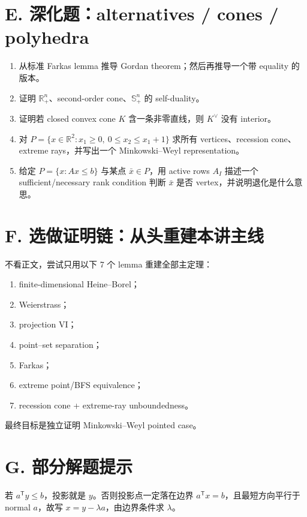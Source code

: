 \documentclass[11pt,a4paper,openany]{ctexrep}
\theoremstyle{definition}
\newcommand{\R}{\mathbb{R}}
\newcommand{\transpose}{\mathsf{T}}
\begin{document}
\section*{E. 深化题：alternatives / cones / polyhedra}
\begin{enumerate}[leftmargin=2.3em]
  \item 从标准 Farkas lemma 推导 Gordan theorem；然后再推导一个带 equality 的版本。
  \item 证明 $\R_+^n$、second-order cone、$\mathbb S_+^n$ 的 self-duality。
  \item 证明若 closed convex cone $K$ 含一条非零直线，则 $K^\vee$ 没有 interior。
  \item 对 $P=\{x\in\R^2:x_1\ge0,\ 0\le x_2\le x_1+1\}$ 求所有 vertices、recession cone、extreme rays，并写出一个 Minkowski--Weyl representation。
  \item 给定 $P=\{x:Ax\le b\}$ 与某点 $\bar x\in P$，用 active rows $A_I$ 描述一个 sufficient/necessary rank condition 判断 $\bar x$ 是否 vertex，并说明退化是什么意思。
\end{enumerate}

\section*{F. 选做证明链：从头重建本讲主线}
不看正文，尝试只用以下 7 个 lemma 重建全部主定理：
\begin{enumerate}[leftmargin=2.3em]
  \item finite-dimensional Heine--Borel；
  \item Weierstrass；
  \item projection VI；
  \item point--set separation；
  \item Farkas；
  \item extreme point/BFS equivalence；
  \item recession cone + extreme-ray unboundedness。
\end{enumerate}
最终目标是独立证明 Minkowski--Weyl pointed case。

\section*{G. 部分解题提示}
\begin{exercisebox}[半空间投影]
若 $a^\transpose y\le b$，投影就是 $y$。否则投影点一定落在边界 $a^\transpose x=b$，且最短方向平行于 normal $a$，故写 $x=y-\lambda a$，由边界条件求 $\lambda$。
\end{exercisebox}
\end{document}

